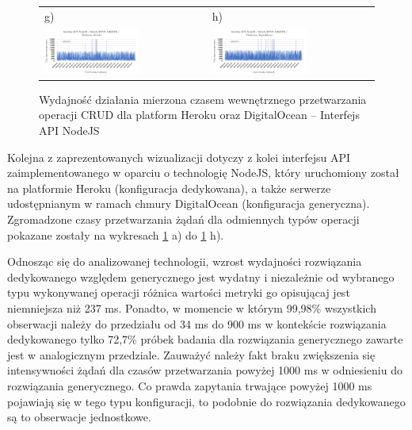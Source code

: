 \begin{figure}[htb]
\begin{tabular}{@{}ll@{}}
    g) & h) \\
    \includegraphics[width=0.6\textwidth]{rys05/nodejs-delete-heroku.pdf} & \includegraphics[width=0.6\textwidth]{rys05/nodejs-delete-digitalocean.pdf} \\
	\end{tabular}
  \caption{Wydajność działania mierzona czasem wewnętrznego przetwarzania operacji CRUD dla platform Heroku oraz DigitalOcean -- Interfejs API NodeJS}
  \label{fig:nodejs-heroku-vs-digitalocean}
\end{figure}

Kolejna z zaprezentowanych wizualizacji dotyczy z kolei interfejsu API zaimplementowanego w oparciu o technologię NodeJS, który uruchomiony został na platformie Heroku (konfiguracja dedykowana), a także serwerze udostępnianym w ramach chmury DigitalOcean (konfiguracja generyczna). Zgromadzone czasy przetwarzania żądań dla odmiennych typów operacji pokazane zostały na wykresach \ref{fig:nodejs-heroku-vs-digitalocean} a) do \ref{fig:nodejs-heroku-vs-digitalocean} h).

Odnosząc się do analizowanej technologii, wzrost wydajności rozwiązania dedykowanego względem generycznego jest wydatny i niezależnie od wybranego typu wykonywanej operacji różnica wartości metryki go opisującaj jest niemniejsza niż 237 ms. Ponadto, w momencie w którym 99,98\% wszystkich obserwacji należy do przedziału od 34 ms do 900 ms w kontekście rozwiązania dedykowanego tylko 72,7\% próbek badania dla rozwiązania generycznego zawarte jest w analogicznym przedziale. Zauważyć należy fakt braku zwiększenia się intensywności żądań dla czasów przetwarzania powyżej 1000 ms w odniesieniu do rozwiązania generycznego. Co prawda zapytania trwające powyżej 1000 ms pojawiają się w tego typu konfiguracji, to podobnie do rozwiązania dedykowanego są to obserwacje jednostkowe.  

